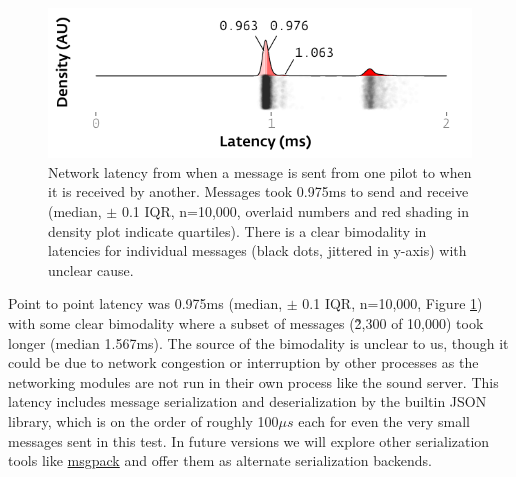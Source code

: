 \begin{figure}
\caption{Network latency from when a message is sent from one pilot to when it is received by another. Messages took 0.975ms to send and receive (median, $\pm$ 0.1 IQR, n=10,000, overlaid numbers and red shading in density plot indicate quartiles). There is a clear bimodality in latencies for individual messages (black dots, jittered in y-axis) with unclear cause.}
\label{fig:netlag}
\includegraphics{figures/networking_latency_raster.pdf}
\end{figure}

Point to point latency was 0.975ms (median, $\pm$ 0.1 IQR, n=10,000, Figure \ref{fig:netlag}) with some clear bimodality where a subset of messages (\~2,300 of 10,000) took longer (median 1.567ms). The source of the bimodality is unclear to us, though it could be due to network congestion or interruption by other processes as the networking modules are not run in their own process like the sound server. This latency includes message serialization and deserialization by the builtin JSON library, which is on the order of roughly 100$\mu s$ each for even the very small messages sent in this test. In future versions we will explore other serialization tools like \href{https://msgpack.org/}{msgpack} and offer them as alternate serialization backends.